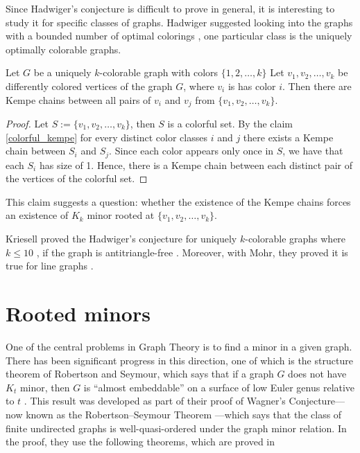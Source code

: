 Since Hadwiger's conjecture is difficult to prove in general, it is interesting to study it for specific classes of graphs.
Hadwiger suggested looking into the graphs with a bounded number of optimal colorings \cite{hadwiger_1943}, 
one particular class is the uniquely optimally colorable graphs.

\begin{claim}
 Let $G$ be a uniquely $k$-colorable graph with colors $\{1, 2, \dots, k\}$ Let $v_1, v_2, \dots, v_k$ be differently colored vertices of the graph $G$, 
 where $v_i$ is has color $i$.
 Then there are Kempe chains between all pairs of $v_i$ and $v_j$ from $\{v_1, v_2, \dots, v_k\}$.
\end{claim}


\begin{proof}
    Let $S := \{v_1, v_2, \dots, v_k\}$, then $S$ is a colorful set. By the claim \ref{colorful_kempe} for every distinct color classes
    $i$ and $j$ there exists a Kempe chain between $S_i$ and $S_j$. Since each color appears only once in $S$, we have that
    each $S_i$ has size of 1. Hence, there is a Kempe chain between each distinct pair of the vertices of the colorful set.
\end{proof}

This claim suggests a question: whether the existence of the Kempe chains forces an existence of $K_k$ minor rooted at
$\{v_1, v_2, \dots, v_k\}$.

Kriesell proved the Hadwiger’s conjecture for uniquely $k$-colorable graphs where $k \leq 10$ \cite{Kriesell2021}, if the graph is antitriangle-free \cite{Kriesell2017}.
Moreover, with Mohr, they proved it is true for line graphs \cite{Kriesell2019}.

\section{Rooted minors}
One of the central problems in Graph Theory is to find a minor in a given graph. There has been significant progress 
in this direction, one of which is the structure theorem of Robertson and Seymour, which says that if a graph $G$ does not have
$K_t$ minor, then $G$ is ``almost embeddable'' on a surface of low Euler genus relative to $t$ \cite{RobertsonSeymourGM16}.
This result was developed as part of their proof of Wagner's Conjecture—now known as the Robertson–Seymour Theorem
—which says that the class of finite undirected graphs is well-quasi-ordered under the graph minor relation.
In the proof, they use the following theorems, which are proved in \cite{RobertsonSeymourGM20}

